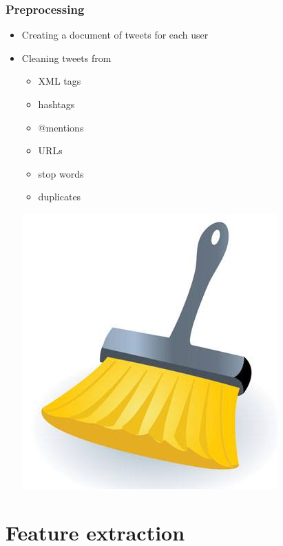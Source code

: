 \documentclass[slidestop,compress,11pt,xcolor=dvipsnames]{beamer}
\begin{document}
\begin{frame}
\frametitle{Preprocessing}
\begin{itemize}
	\item Creating a document of tweets for each user
	\item Cleaning tweets from
	\begin{itemize}
		\item XML tags
		\item hashtags
		\item @mentions
		\item URLs
		\item stop words		
		\item duplicates
		
	\end{itemize}
	\vspace{-8mm}
	\centerline{\includegraphics[scale=0.3]{cleaning}}
\end{itemize}
\end{frame}

\section{Feature extraction}
\end{document}
